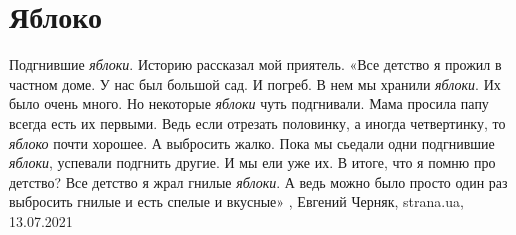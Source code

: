  
 
 
 
 
\chapter{Яблоко}
\label{sec:slova.jabloko}

Подгнившие \emph{яблоки}.  Историю рассказал мой приятель.  «Все детство я прожил в
частном доме.  У нас был большой сад. И погреб.  В нем мы хранили \emph{яблоки}. Их
было очень много. Но некоторые \emph{яблоки} чуть подгнивали.  Мама просила папу
всегда есть их первыми.  Ведь если отрезать половинку, а иногда четвертинку, то
\emph{яблоко} почти хорошее. А выбросить жалко.  Пока мы сьедали одни подгнившие
\emph{яблоки}, успевали подгнить другие. И мы ели уже их.  В итоге, что я помню про
детство?  Все детство я жрал гнилые \emph{яблоки}.  А ведь можно было просто один раз
выбросить гнилые и есть спелые и вкусные»
, 
Евгений Черняк, strana.ua, 13.07.2021
